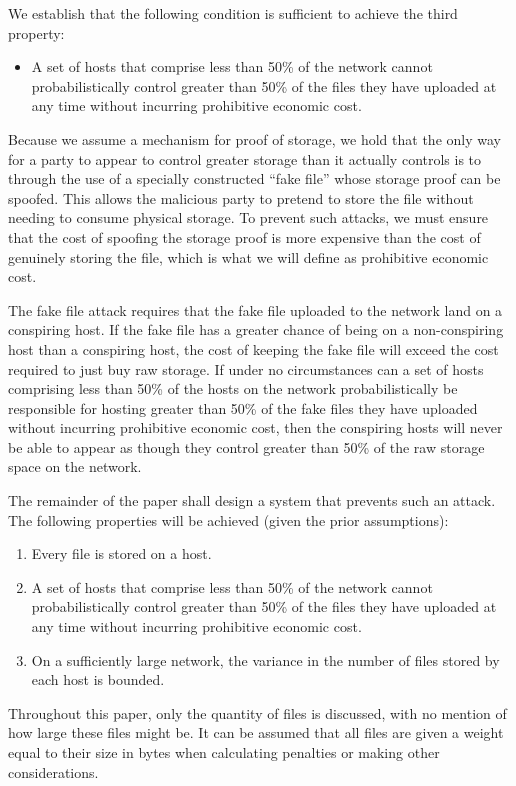 \documentclass[twocolumn]{article}
\begin{document}
We establish that the following condition is sufficient to achieve the third property:
\begin{itemize}
	\item A set of hosts that comprise less than 50\% of the network cannot probabilistically control greater than 50\% of the files they have uploaded at any time without incurring prohibitive economic cost.
\end{itemize}
Because we assume a mechanism for proof of storage, we hold that the only way for a party to appear to control greater storage than it actually controls is to through the use of a specially constructed ``fake file'' whose storage proof can be spoofed.
This allows the malicious party to pretend to store the file without needing to consume physical storage.
To prevent such attacks, we must ensure that the cost of spoofing the storage proof is more expensive than the cost of genuinely storing the file, which is what we will define as prohibitive economic cost.

The fake file attack requires that the fake file uploaded to the network land on a conspiring host.
If the fake file has a greater chance of being on a non-conspiring host than a conspiring host, the cost of keeping the fake file will exceed the cost required to just buy raw storage.
If under no circumstances can a set of hosts comprising less than 50\% of the hosts on the network probabilistically be responsible for hosting greater than 50\% of the fake files they have uploaded without incurring prohibitive economic cost, then the conspiring hosts will never be able to appear as though they control greater than 50\% of the raw storage space on the network.

The remainder of the paper shall design a system that prevents such an attack. The following properties will be achieved (given the prior assumptions):
\begin{enumerate}
	\item Every file is stored on a host.
	\item A set of hosts that comprise less than 50\% of the network cannot probabilistically control greater than 50\% of the files they have uploaded at any time without incurring prohibitive economic cost.
	\item On a sufficiently large network, the variance in the number of files stored by each host is bounded.
\end{enumerate}

Throughout this paper, only the quantity of files is discussed, with no mention of how large these files might be.
It can be assumed that all files are given a weight equal to their size in bytes when calculating penalties or making other considerations.
\end{document}
